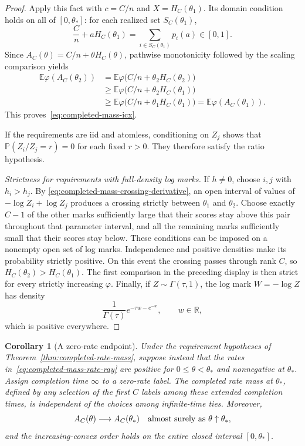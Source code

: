 \documentclass[11pt]{article}
\newtheorem{corollary}{Corollary}
\theoremstyle{definition}
\theoremstyle{remark}
\newcommand{\E}{\mathbb E}
\newcommand{\Pbb}{\mathbb P}
\newcommand{\R}{\mathbb R}
\newcommand{\1}{\mathbf 1}
\begin{document}
\begin{proof}
Apply this fact with \(c=C/n\) and \(X=H_C(\theta_1)\).
Its domain condition holds on all of \([0,\theta_*]\): for each
realized set \(S_C(\theta_1)\),
\[
  \frac Cn+aH_C(\theta_1)
  =\sum_{i\in S_C(\theta_1)}p_i(a)\in[0,1].
\]
Since \(A_C(\theta)=C/n+\theta H_C(\theta)\), pathwise
monotonicity followed by the scaling comparison yields
\begin{align*}
  \E\varphi(A_C(\theta_2))
  &=\E\varphi\bigl(C/n+\theta_2H_C(\theta_2)\bigr)\\
  &\ge\E\varphi\bigl(C/n+\theta_2H_C(\theta_1)\bigr)\\
  &\ge\E\varphi\bigl(C/n+\theta_1H_C(\theta_1)\bigr)
   =\E\varphi(A_C(\theta_1)).
\end{align*}
This proves~\eqref{eq:completed-mass-icx}.

If the requirements are iid and atomless, conditioning on \(Z_j\)
shows that \(\Pbb(Z_i/Z_j=r)=0\) for each fixed \(r>0\).
They therefore satisfy the ratio hypothesis.

\medskip\noindent\emph{Strictness for requirements with full-density log marks.}
If \(h\ne0\), choose \(i,j\) with \(h_i>h_j\).  By
\eqref{eq:completed-mass-crossing-derivative}, an open interval of
values of \(-\log Z_i+\log Z_j\) produces a crossing strictly
between \(\theta_1\) and \(\theta_2\).  Choose exactly \(C-1\)
of the other marks sufficiently large that their scores stay above
this pair throughout that parameter interval, and all the
remaining marks sufficiently small that their scores stay below.
These conditions can be imposed on a nonempty open set of log
marks.  Independence and positive densities make its probability
strictly positive.  On this event the crossing passes through rank
\(C\), so
\(H_C(\theta_2)>H_C(\theta_1)\).  The first comparison in the
preceding display is then strict for every strictly increasing
\(\varphi\).  Finally, if \(Z\sim\Gamma(\tau,1)\), the log mark
\(W=-\log Z\) has density
\[
  \frac1{\Gamma(\tau)}e^{-\tau w-e^{-w}},\qquad w\in\R,
\]
which is positive everywhere.
\end{proof}

\begin{corollary}[A zero-rate endpoint]
\label{cor:completed-mass-boundary}
Under the requirement hypotheses of
Theorem~\ref{thm:completed-rate-mass}, suppose instead that the rates
in~\eqref{eq:completed-mass-rate-ray} are positive for
\(0\le\theta<\theta_*\) and nonnegative at \(\theta_*\).  Assign
completion time \(\infty\) to a zero-rate label.  The completed
rate mass at \(\theta_*\), defined by any selection of the first
\(C\) labels among these extended completion times, is independent
of the choices among infinite-time ties.  Moreover,
\[
  A_C(\theta)\longrightarrow A_C(\theta_*)
  \quad\hbox{almost surely as }\theta\uparrow\theta_*,
\]
and the increasing-convex order holds on the entire closed interval
\([0,\theta_*]\).
\end{corollary}
\end{document}
